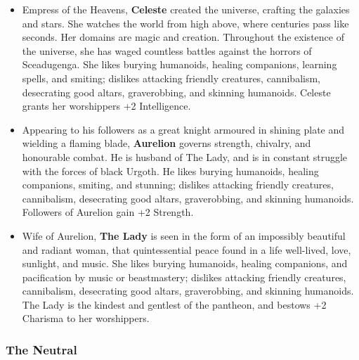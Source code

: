 \begin{itemize}
\item Empress of the Heavens, {\bf Celeste} created the universe, crafting 
the galaxies and stars.  She watches the world from high above, where 
centuries pass like seconds.  Her domains are magic and creation.  
Throughout the existence of the universe, she has waged countless battles 
against the horrors of Sceadugenga.  She likes burying humanoids, healing
companions, learning spells, and smiting; dislikes attacking friendly 
creatures, cannibalism, desecrating good altars, graverobbing, and skinning 
humanoids.  Celeste grants her worshippers +2 Intelligence.

\item Appearing to his followers as a great knight armoured in shining
plate and wielding a flaming blade, {\bf Aurelion} governs strength, 
chivalry, and honourable combat.  He is husband of The Lady, and is in 
constant struggle with the forces of black Urgoth.  He likes burying humanoids,
healing companions, smiting, and stunning; dislikes attacking friendly 
creatures, cannibalism, desecrating good altars, graverobbing, and skinning 
humanoids. Followers of Aurelion gain +2 Strength.

\item Wife of Aurelion, {\bf The Lady} is seen in the form of an 
impossibly beautiful and radiant woman, that quintessential peace found in
a life well-lived, love, sunlight, and music.  She likes burying humanoids,
healing companions, and pacification by music or beastmastery; dislikes 
attacking friendly creatures, cannibalism, desecrating good altars, 
graverobbing, and skinning humanoids.  The Lady is the kindest and gentlest of 
the pantheon, and bestows +2 Charisma to her worshippers.
\end{itemize}

\subsubsection{The Neutral}

